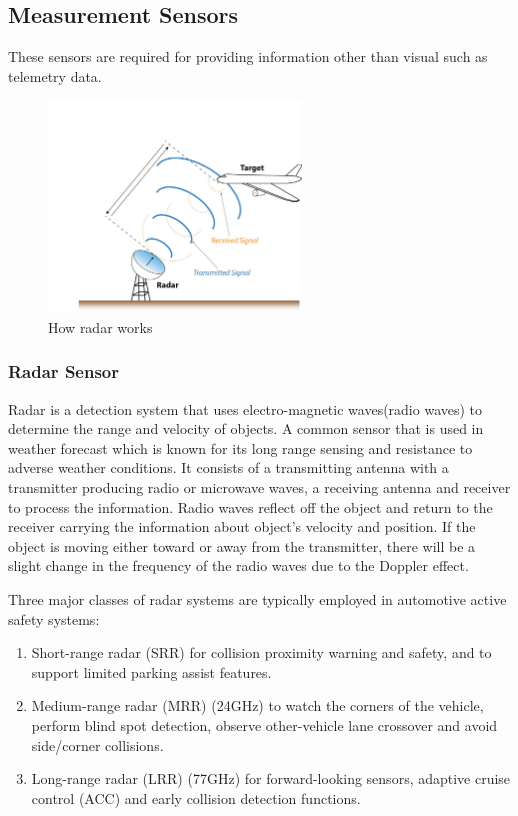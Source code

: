 \subsection{Measurement Sensors}
These sensors are required for providing information other than visual such as telemetry
data.
\begin{figure}[h]
	\centering
    \includegraphics[width=0.6\textwidth, scale=0.1]{figures/inkscape/RadarFig.jpg}
    \caption{How radar works}
    \label{fig:radarsensor}
\end{figure}

\subsubsection*{Radar Sensor}
Radar is a detection system that uses electro-magnetic waves(radio waves) to determine the
range and velocity of objects. A common sensor that is used in weather forecast which is known for its
long range sensing and resistance to adverse weather conditions. It consists of a transmitting antenna with a
transmitter producing radio or microwave waves, a receiving antenna and receiver to
process the information. Radio waves reflect off the object and return to the receiver
carrying the information about object's velocity and position.
If the object is moving either toward or away from the transmitter, there will be a slight change in the frequency of the radio waves due to the Doppler effect.

Three major classes of radar systems are typically employed in automotive active safety systems:
\begin{enumerate}
    \item Short-range radar (SRR) for collision proximity warning and safety, and to support limited parking assist features.
    \item Medium-range radar (MRR) (24GHz) to watch the corners of the vehicle, perform blind spot detection, observe other-vehicle lane crossover and avoid side/corner collisions.
    \item Long-range radar (LRR) (77GHz) for forward-looking sensors, adaptive cruise control (ACC) and early collision detection functions.
\end{enumerate}

